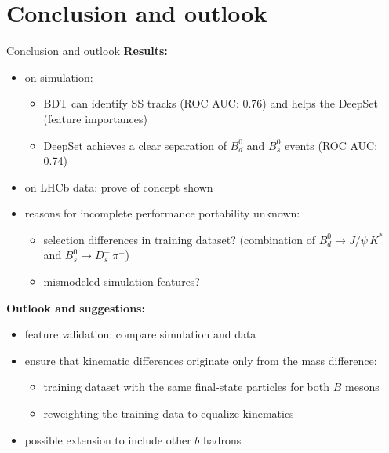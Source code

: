 \documentclass[aspectratio=1610, 10pt]{beamer}
\begin{document}
\section*{Conclusion and outlook}

\begin{frame}{Conclusion and outlook}
  \textbf{Results:}
  \begin{itemize}
    \item on simulation:
    \begin{itemize}
      \item BDT can identify SS tracks (ROC AUC: 0.76) and helps the DeepSet (feature importances)
      \item DeepSet achieves a clear separation of $B^0_d$ and $B^0_s$ events (ROC AUC: 0.74)
    \end{itemize}
    \item on LHCb data: prove of concept shown
    \item reasons for incomplete performance portability unknown:
    \begin{itemize}
      \item selection differences in training dataset? (combination of $B^0_d \rightarrow J/\psi \, K^*$ and $B^0_s \rightarrow D_s^+ \, \pi^-$)
      \item mismodeled simulation features?
    \end{itemize}
  \end{itemize}
  
  \pause
  \medskip
  \textbf{Outlook and suggestions:}
  \begin{itemize}
    \item feature validation: compare simulation and data
    \item ensure that kinematic differences originate only from the mass difference:
    \begin{itemize}
      \item training dataset with the same final-state particles for both $B$ mesons
      \item reweighting the training data to equalize kinematics
    \end{itemize}
    \item possible extension to include other $b$ hadrons
  \end{itemize}
\end{frame}

\appendix
\end{document}
